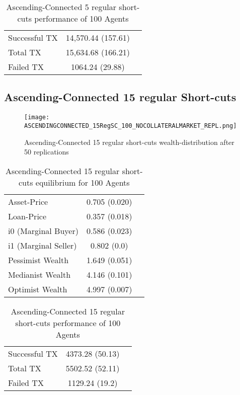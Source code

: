\documentclass[Bachelorarbeit.tex]{subfiles}
\begin{document}
\begin{table}[!htbp]
	\caption{Ascending-Connected 5 regular short-cuts performance of 100 Agents}
	\centering
	\begin{tabular} { l c r }
		\hline
		Successful TX & 14,570.44 (157.61) \\
		Total TX & 15,634.68 (166.21) \\
		Failed TX & 1064.24 (29.88) \\
		\hline
	\end{tabular}
\end{table}

\subsection{Ascending-Connected 15 regular Short-cuts }
\begin{figure}[!htbp]
	\centering
  \texttt{[image: ASCENDINGCONNECTED\_15RegSC\_100\_NOCOLLATERALMARKET\_REPL.png]}
	\caption{Ascending-Connected 15 regular short-cuts wealth-distribution after 50 replications}
	\label{fig1}
\end{figure}

\begin{table}[!htbp]
	\caption{Ascending-Connected 15 regular short-cuts equilibrium for 100 Agents}
	\centering
	\begin{tabular} { l c r }
		\hline
		Asset-Price & 0.705 (0.020) \\
		Loan-Price & 0.357 (0.018) \\
		i0 (Marginal Buyer) & 0.586 (0.023) \\
		i1 (Marginal Seller) & 0.802 (0.0) \\
		Pessimist Wealth & 1.649 (0.051) \\
		Medianist Wealth & 4.146 (0.101) \\
		Optimist Wealth & 4.997 (0.007) \\
		\hline
	\end{tabular}
\end{table} 

\begin{table}[!htbp]
	\caption{Ascending-Connected 15 regular short-cuts performance of 100 Agents}
	\centering
	\begin{tabular} { l c r }
		\hline
		Successful TX & 4373.28 (50.13) \\
		Total TX & 5502.52 (52.11) \\
		Failed TX & 1129.24 (19.2) \\
		\hline
	\end{tabular}
\end{table}
\end{document}
